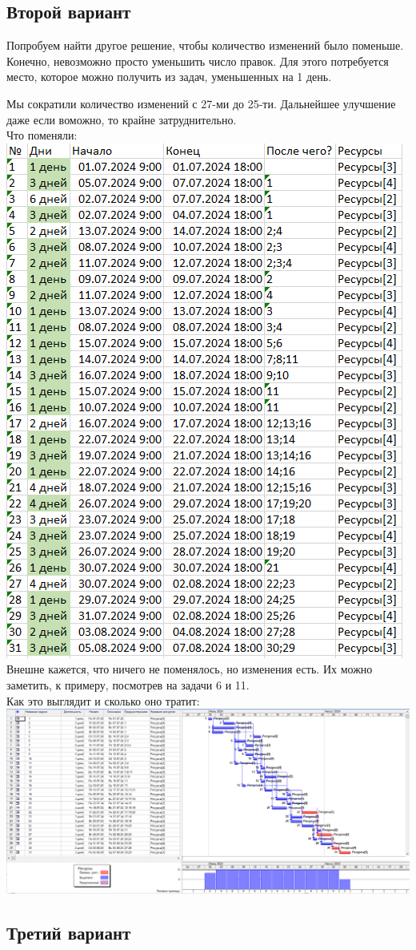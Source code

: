 \documentclass[14pt]{article}
\begin{document}
	\subsection{Второй вариант}
		Попробуем найти другое решение, чтобы количество изменений было поменьше.
		Конечно, невозможно просто уменьшить число правок.
		Для этого потребуется место, которое можно получить из задач, уменьшенных на 1 день.
		
		Мы сократили количество изменений с 27-ми до 25-ти.
		Дальнейшее улучшение даже если воможно, то крайне затруднительно.\\
		{\LARGE Что поменяли:}\\
		\includegraphics[height=0.6\textheight]{../img/1a2_days_change.png}\\ 
		Внешне кажется, что ничего не поменялось, но изменения есть.
		Их можно заметить, к примеру, посмотрев на задачи 6 и 11.\\
		{\LARGE Как это выглядит и сколько оно тратит:}\\
		\includegraphics[width=\textwidth]{../img/1a2_answer.png}\\ 
	\subsection{Третий вариант}
\end{document}
